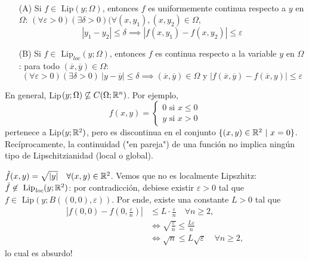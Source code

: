 \documentclass[a4paper]{report}
\begin{document}
\begin{prop}~
	\begin{enumerate}
		\item[(A)] Si $f \in \text{ Lip}(y;\Omega)$, entonces $f$ es uniformemente continua respecto a $y$ en $\Omega$: $(\forall \varepsilon > 0)(\exists \delta > 0)(\forall (x,y_1),(x,y_2) \in \Omega,$
		\[ |y_1-y_2|\leq\delta \implies |f(x,y_1)-f(x,y_2)| \leq \varepsilon \]

		\item[(B)] Si $f\in \text{ Lip}_{\textit{loc}}(y;\Omega)$, entonces $f$ es continua respecto a la variable $y$ en $\Omega$: para todo $(\overline{x},\overline{y})\in\Omega$:
		\[ (\forall \varepsilon > 0)(\exists \delta > 0)\ |y-\overline{y}|\leq \delta \implies (\overline{x},\overline{y})\in\Omega \text{ y } |f(\overline{x},\overline{y}) - f(\overline{x},y)| \leq \varepsilon \]
	\end{enumerate}
\end{prop}

\begin{remark}
	En general, Lip$(y;\Omega) \not\subseteq C(\Omega;\mathbb{R}^n)$. Por ejemplo,
	\[ f(x,y) = \begin{cases}
		0 \text{ si } x \leq 0 \\
		y \text{ si } x > 0
	\end{cases} \]
	pertenece a Lip$(y;\mathbb{R}^2)$, pero es discontinua en el conjunto $\{ (x,y) \in \mathbb{R}^2 \ | \ x = 0 \}$. Recíprocamente, la continuidad ("en pareja") de una función no implica ningún tipo de Lipschitzianidad (local o global).
\end{remark}

\begin{eg}
	$\hat{f}(x,y) = \sqrt{|y|}\quad \forall (x,y) \in \mathbb{R}^2$. Vemos que no es localmente Lipszhitz: $\hat{f} \not\in \text{ Lip}_{\textit{loc}}(y;\mathbb{R}^2)$: por contradicción, debiese existir $\varepsilon > 0$ tal que $f \in \text{ Lip}(y; B((0,0),\varepsilon))$. Por ende, existe una constante $L>0$ tal que
	\begin{align*}
		\left|f(0,0)-f \left(0,\frac{\varepsilon}{n}\right)\right| & \leq L \cdot \frac{\varepsilon}{n} \quad \forall n \geq 2, \\
		& \iff \sqrt{\frac{\varepsilon}{n}} \leq \frac{L \varepsilon}{n} \\
		& \iff \sqrt{n} \leq L \sqrt{\varepsilon} \quad \forall n \geq 2,
	\end{align*}
	\noindent lo cual es absurdo!
\end{eg}
\end{document}
